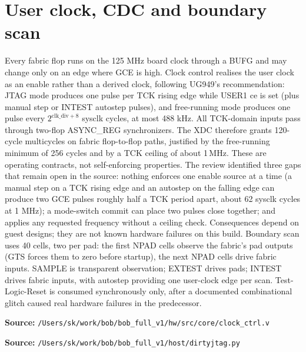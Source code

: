 \documentclass[11pt,a4paper]{article}
\newcommand{\code}[1]{\texttt{\detokenize{#1}}}
\newcommand{\src}[1]{\par\smallskip\noindent\textbf{Source: }\nolinkurl{/Users/sk/work/bob/bob_full_v1/#1}\par\smallskip}
\begin{document}
\section{User clock, CDC and boundary scan}
\label{sec:clock}
Every fabric flop runs on the 125 MHz board clock through a BUFG and may change
only on an edge where GCE is high. Clock control realises the user clock as an
enable rather than a derived clock, following UG949's recommendation: JTAG mode
produces one pulse per TCK rising edge while USER1 ce is set (plus manual step
or INTEST autostep pulses), and free-running mode produces one pulse every
$2^{\mathrm{clk\_div}+8}$ sysclk cycles, at most 488 kHz. All TCK-domain inputs
pass through two-flop ASYNC\_REG synchronizers. The XDC therefore grants
120-cycle multicycles on fabric flop-to-flop paths, justified by the free-running
minimum of 256 cycles and by a TCK ceiling of about 1\,MHz.
These are operating contracts, not self-enforcing properties. The review
identified three gaps that remain open in the source: nothing enforces one
enable source at a time (a manual step on a TCK rising edge and an autostep on
the falling edge can produce two GCE pulses roughly half a TCK period apart,
about 62 sysclk cycles at 1 MHz); a mode-switch commit can place two pulses
close together; and \code{dirtyjtag.py} applies any requested frequency without
a ceiling check. Consequences depend on guest designs; they are not known
hardware failures on this build.
Boundary scan uses 40 cells, two per pad: the first NPAD cells observe the
fabric's pad outputs (GTS forces them to zero before startup), the next NPAD
cells drive fabric inputs. SAMPLE is transparent observation; EXTEST drives
pads; INTEST drives fabric inputs, with autostep providing one user-clock edge
per scan. Test-Logic-Reset is consumed synchronously only, after a documented
combinational glitch caused real hardware failures in the predecessor.
\src{hw/src/core/clock_ctrl.v}
\src{host/dirtyjtag.py}
\end{document}

